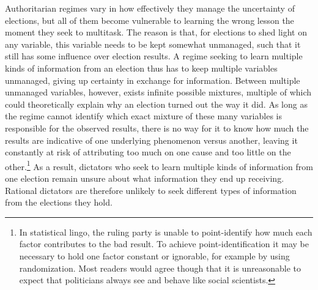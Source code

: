 \documentclass[12pt]{article}\usepackage[]{graphicx}\usepackage[]{color}
\newcommand{\1}{\mathbbm{1}}
\begin{document}
Authoritarian regimes vary in how effectively they manage the uncertainty of elections, but all of them become vulnerable to learning the wrong lesson the moment they seek to multitask. The reason is that, for elections to shed light on any variable, this variable needs to be kept somewhat unmanaged, such that it still has some influence over election results. A regime seeking to learn multiple kinds of information from an election thus has to keep multiple variables unmanaged, giving up certainty in exchange for information. Between multiple unmanaged variables, however, exists infinite possible mixtures, multiple of which could theoretically explain why an election turned out the way it did. As long as the regime cannot identify which exact mixture of these many variables is responsible for the observed results, there is no way for it to know how much the results are indicative of one underlying phenomenon versus another, leaving it constantly at risk of attributing too much on one cause and too little on the other.\footnote{In statistical lingo, the ruling party is unable to point-identify how much each factor contributes to the bad result. To achieve point-identification it may be necessary to hold one factor constant or ignorable, for example by using randomization. Most readers would agree though that it is unreasonable to expect that politicians always see and behave like social scientists.}  As a result, dictators who seek to learn multiple kinds of information from one election remain unsure about what information they end up receiving. Rational dictators are therefore unlikely to seek different types of information from the elections they hold.
\end{document}
